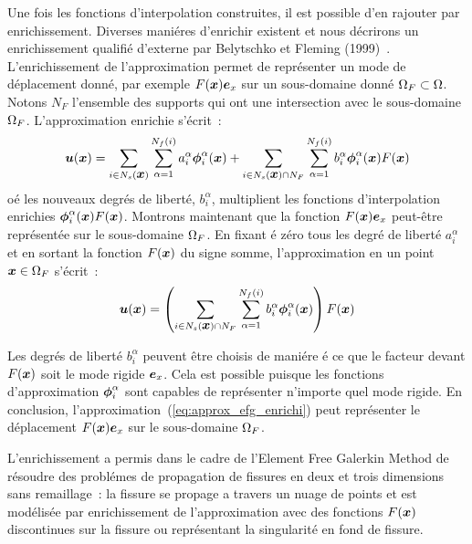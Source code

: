 Une fois les fonctions d'interpolation
construites, il est possible d'en rajouter
par enrichissement.
Diverses mani\'eres d'enrichir existent et nous d\'ecrirons
un  enrichissement qualifi\'e d'externe
par Belytschko et Fleming (1999)~\cite{Fleming:enrichment}.
L'enrichissement de l'approximation permet
de repr\'esenter
un mode de d\'eplacement donn\'e, par exemple
$F(\mbox{\boldmath $x$})\mbox{\boldmath $e$}_x$ sur un sous-domaine donn\'e
${\Omega}_F\subset{\Omega}$.
Notons $N_F$ l'ensemble des supports qui ont une intersection
avec le sous-domaine ${\Omega}_F$. L'approximation enrichie s'\'ecrit~:
\begin{equation}
  \label{eq:approx_efg_enrichi}
  \mbox{\boldmath $u$}(\mbox{\boldmath $x$}) = \sum_{i \in N_s(\mbox{\boldmath $x$})}  \sum_{\alpha = 1}^{N_f(i)}
                                 a_i^\alpha \mbox{\boldmath $\phi$}_i^\alpha(\mbox{\boldmath $x$}) +
               \sum_{i \in N_s(\mbox{\boldmath $x$}) \cap N_F}
                                 \sum_{\alpha = 1}^{N_f(i)}
                                 b_i^\alpha \mbox{\boldmath $\phi$}_i^\alpha(\mbox{\boldmath $x$}) F(\mbox{\boldmath $x$})
\end{equation}
o\'e les nouveaux degr\'es de libert\'e, $b_i^\alpha$, multiplient les
fonctions d'interpolation enrichies $\mbox{\boldmath $\phi$}_i^\alpha(\mbox{\boldmath $x$}) F(\mbox{\boldmath $x$})$.
Montrons maintenant que la fonction $F(\mbox{\boldmath $x$})\mbox{\boldmath $e$}_x$
peut-\^etre repr\'esent\'ee sur le sous-domaine ${\Omega}_F$.
En fixant \'e z\'ero tous les degr\'e de libert\'e $a_i^\alpha$
et en sortant la fonction $F(\mbox{\boldmath $x$})$ du signe somme,
l'approximation en un point $\mbox{\boldmath $x$} \in {\Omega}_F$
s'\'ecrit~:
\begin{equation}
  \mbox{\boldmath $u$}(\mbox{\boldmath $x$}) =    \left( \sum_{i \in N_s(\mbox{\boldmath $x$}) \cap N_F}
                   \sum_{\alpha = 1}^{N_f(i)}
                   b_i^\alpha \mbox{\boldmath $\phi$}_i^\alpha(\mbox{\boldmath $x$}) \right)
                   F(\mbox{\boldmath $x$})
\end{equation}

Les degr\'es de libert\'e $b_i^\alpha$ peuvent \^etre
choisis de mani\'ere \'e ce que le facteur devant $F(\mbox{\boldmath $x$})$
soit le mode rigide $\mbox{\boldmath $e$}_x$. Cela est possible
puisque les fonctions d'approximation $\mbox{\boldmath $\phi$}_i^\alpha$
sont capables de repr\'esenter
n'importe quel mode rigide. En conclusion,
l'approximation~(\ref{eq:approx_efg_enrichi}) peut repr\'esenter
le d\'eplacement $F(\mbox{\boldmath $x$})\mbox{\boldmath $e$}_x$ sur le sous-domaine ${\Omega}_F$.

L'enrichissement a permis
dans le cadre de l'Element Free Galerkin Method
de r\'esoudre des probl\'emes de propagation de
fissures en deux et trois dimensions sans remaillage~\cite{Krysl:3D}:
la fissure se propage a travers un nuage de points et
est mod\'elis\'ee par enrichissement de l'approximation
avec des fonctions $F(\mbox{\boldmath $x$})$ discontinues sur la fissure
ou repr\'esentant la singularit\'e en fond de fissure.

